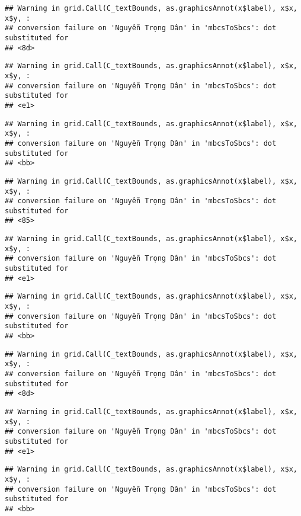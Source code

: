 \documentclass[
]{article}
\begin{document}
\begin{verbatim}
## Warning in grid.Call(C_textBounds, as.graphicsAnnot(x$label), x$x, x$y, :
## conversion failure on 'Nguyễn Trọng Dân' in 'mbcsToSbcs': dot substituted for
## <8d>
\end{verbatim}

\begin{verbatim}
## Warning in grid.Call(C_textBounds, as.graphicsAnnot(x$label), x$x, x$y, :
## conversion failure on 'Nguyễn Trọng Dân' in 'mbcsToSbcs': dot substituted for
## <e1>
\end{verbatim}

\begin{verbatim}
## Warning in grid.Call(C_textBounds, as.graphicsAnnot(x$label), x$x, x$y, :
## conversion failure on 'Nguyễn Trọng Dân' in 'mbcsToSbcs': dot substituted for
## <bb>
\end{verbatim}

\begin{verbatim}
## Warning in grid.Call(C_textBounds, as.graphicsAnnot(x$label), x$x, x$y, :
## conversion failure on 'Nguyễn Trọng Dân' in 'mbcsToSbcs': dot substituted for
## <85>
\end{verbatim}

\begin{verbatim}
## Warning in grid.Call(C_textBounds, as.graphicsAnnot(x$label), x$x, x$y, :
## conversion failure on 'Nguyễn Trọng Dân' in 'mbcsToSbcs': dot substituted for
## <e1>
\end{verbatim}

\begin{verbatim}
## Warning in grid.Call(C_textBounds, as.graphicsAnnot(x$label), x$x, x$y, :
## conversion failure on 'Nguyễn Trọng Dân' in 'mbcsToSbcs': dot substituted for
## <bb>
\end{verbatim}

\begin{verbatim}
## Warning in grid.Call(C_textBounds, as.graphicsAnnot(x$label), x$x, x$y, :
## conversion failure on 'Nguyễn Trọng Dân' in 'mbcsToSbcs': dot substituted for
## <8d>
\end{verbatim}

\begin{verbatim}
## Warning in grid.Call(C_textBounds, as.graphicsAnnot(x$label), x$x, x$y, :
## conversion failure on 'Nguyễn Trọng Dân' in 'mbcsToSbcs': dot substituted for
## <e1>
\end{verbatim}

\begin{verbatim}
## Warning in grid.Call(C_textBounds, as.graphicsAnnot(x$label), x$x, x$y, :
## conversion failure on 'Nguyễn Trọng Dân' in 'mbcsToSbcs': dot substituted for
## <bb>
\end{verbatim}
\end{document}

